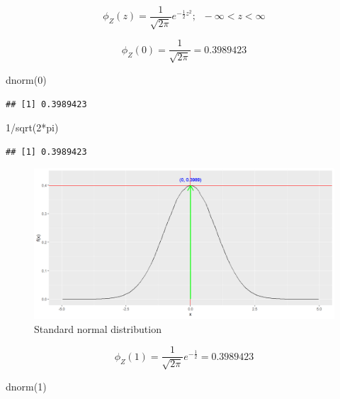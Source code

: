 \documentclass[
]{book}
\newenvironment{Shaded}{\begin{snugshade}}{\end{snugshade}}
\newcommand{\DecValTok}[1]{\textcolor[rgb]{0.00,0.00,0.81}{#1}}
\newcommand{\FunctionTok}[1]{\textcolor[rgb]{0.00,0.00,0.00}{#1}}
\newcommand{\NormalTok}[1]{#1}
\newcommand{\SpecialCharTok}[1]{\textcolor[rgb]{0.00,0.00,0.00}{#1}}
\begin{document}
\[\phi_Z(z) = \frac{1}{\sqrt{2 \pi}}e^{-\frac{1}{2}z^2};\;\; -\infty< z< \infty\]

\[\phi_Z(0) = \frac{1}{\sqrt{2 \pi}} =  0.3989423\]

\begin{Shaded}
\begin{Highlighting}[]
\FunctionTok{dnorm}\NormalTok{(}\DecValTok{0}\NormalTok{)}
\end{Highlighting}
\end{Shaded}

\begin{verbatim}
## [1] 0.3989423
\end{verbatim}

\begin{Shaded}
\begin{Highlighting}[]
\DecValTok{1}\SpecialCharTok{/}\FunctionTok{sqrt}\NormalTok{(}\DecValTok{2}\SpecialCharTok{*}\NormalTok{pi)}
\end{Highlighting}
\end{Shaded}

\begin{verbatim}
## [1] 0.3989423
\end{verbatim}

\begin{figure}

{\centering \includegraphics{figure/norm4-1} 

}

\caption{Standard normal distribution}\label{fig:norm4}
\end{figure}

\[\phi_Z(1) = \frac{1}{\sqrt{2 \pi}}e^{-\frac{1}{2}} =  0.3989423\]

\begin{Shaded}
\begin{Highlighting}[]
\FunctionTok{dnorm}\NormalTok{(}\DecValTok{1}\NormalTok{)}
\end{Highlighting}
\end{Shaded}
\end{document}
